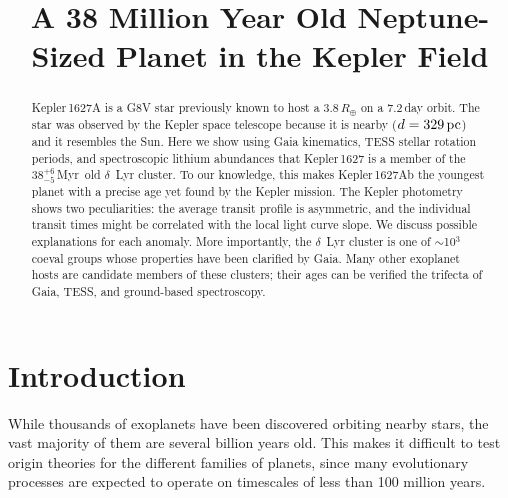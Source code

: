 \documentclass[12pt,modern,twocolumn,tighten,linenumbers]{aastex63}
\newcommand{\clusterage}{$38^{+6}_{-5}$\,Myr} %
\begin{document}
\title{
  A 38 Million Year Old Neptune-Sized Planet in the Kepler Field
}



\begin{abstract}
  Kepler\,1627A is a G8V star previously known to host a
  $3.8\,R_\oplus$  on a 7.2\,day orbit.  The star was
  observed by the Kepler space telescope because it is nearby
  ($d=329\,{\rm pc}$) and it resembles the Sun.  Here we show using
  Gaia kinematics, TESS stellar rotation periods, and spectroscopic
  lithium abundances that Kepler\,1627 is a member of the \clusterage\
  old $\delta$~Lyr cluster.  To our knowledge, this makes
  Kepler\,1627Ab the youngest planet with a precise age yet found by
  the \replaced{main}{prime} Kepler mission.  The Kepler photometry shows two
  peculiarities: the average transit profile is asymmetric, and the
  individual transit times might be correlated with the local light curve
  slope.  We discuss possible explanations for each anomaly.  More
  importantly, the $\delta$~Lyr cluster
  is one of $\sim$10$^3$ coeval groups whose properties have been clarified
  by Gaia.  Many other exoplanet hosts are candidate members
  of these clusters; their ages can be verified  the
  trifecta of Gaia, TESS, and ground-based spectroscopy.
\end{abstract}




\section{Introduction}

While thousands of exoplanets have been discovered orbiting nearby
stars, the vast majority of them are several billion years old.  This
makes it difficult to test origin theories for the different families
of planets, since many evolutionary processes are expected to operate
on timescales of less than 100 million years.
\end{document}
